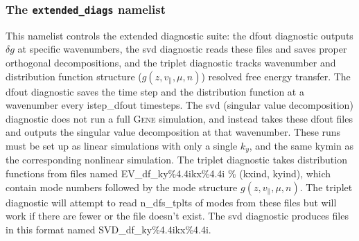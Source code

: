 \documentclass[12pt]{article}
\begin{document}
\subsubsection{The \texttt{extended\_diags} namelist}
This namelist controls the extended diagnostic suite: the dfout diagnostic outputs $\delta g$ at specific wavenumbers, the svd diagnostic reads these files and saves proper orthogonal decompositions, and the triplet diagnostic tracks wavenumber and distribution function structure ($g(z,v_{\parallel},\mu,n)$) resolved free energy transfer. The dfout diagnostic saves the time step and the distribution function at a wavenumber every istep\_dfout timesteps. The svd (singular value decomposition) diagnostic does not run a full \textsc{Gene} simulation, and instead takes these dfout files and outputs the singular value decomposition at that wavenumber. These runs must be set up as linear simulations with only a single $k_{y}$, and the same kymin as the corresponding nonlinear simulation. The triplet diagnostic takes distribution functions from files named EV\_df\_ky{\%4.4i}kx{\%4.4i} \% (kxind, kyind), which contain mode numbers followed by the mode structure $g(z,v_{\parallel},\mu,n)$. The triplet diagnostic will attempt to read n\_dfs\_tplts of modes from these files but will work if there are fewer or the file doesn't exist. The svd diagnostic produces files in this format named SVD\_df\_ky{\%4.4i}kx{\%4.4i}.
\end{document}
